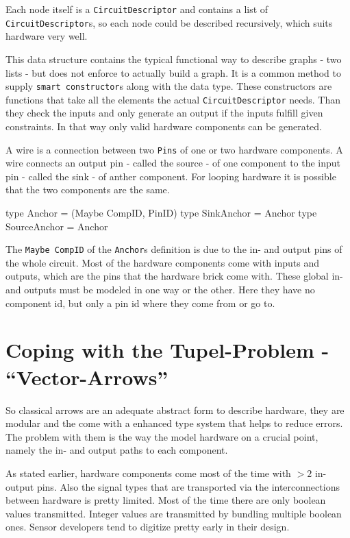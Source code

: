 \documentclass[9pt,final,a4paper,leqno]{article}
\newcommand{\hs}[1]{\mbox{\lstinline[basicstyle=\color{textgray}]!#1!}}
\begin{document}
\par 
Each node itself is a \hs{CircuitDescriptor} and contains a list of \hs{CircuitDescriptor}s, so each node could be described recursively,
which suits hardware very well.

\par 
This data structure contains the typical functional way to describe graphs - two lists - but does not enforce to actually build a graph. It
is a common method to supply \hs{smart constructor}s along with the data type. These constructors are functions that take all the elements
the actual \hs{CircuitDescriptor} needs. Than they check the inputs and only generate an output if the inputs fulfill given constraints. In
that way only valid hardware components can be generated. 

\par
A wire is a connection between two \hs{Pins} of one or two hardware components. A wire connects an output pin - called the source - of one
component to the input pin - called the sink - of anther component. For looping hardware it is possible that the two components are the
same. 
\begin{haskell}
  type Anchor       = (Maybe CompID, PinID)
  type SinkAnchor   = Anchor
  type SourceAnchor = Anchor
\end{haskell}

The \hs{Maybe CompID} of the \hs{Anchor}s definition is due to the in- and output pins of the whole circuit. Most of the hardware components
come with inputs and outputs, which are the pins that the hardware brick come with. These global in- and outputs must be modeled in one way
or the other. Here they have no component id, but only a pin id where they come from or go to. 


\section{Coping with the Tupel-Problem - ``Vector-Arrows''}
So classical arrows are an adequate abstract form to describe hardware, they are modular and the come with a enhanced type system that
helps to reduce errors. The problem with them is the way the model hardware on a crucial point, namely the in- and output paths to each
component. 

\par
As stated earlier, hardware components come most of the time with $>2$ in- output pins. Also the signal types that are transported via the
interconnections between hardware is pretty limited. Most of the time there are only boolean values transmitted. Integer values are
transmitted by bundling multiple boolean ones. Sensor developers tend to digitize pretty early in their design. \cite{MakinwaSmatSensors}
\end{document}
